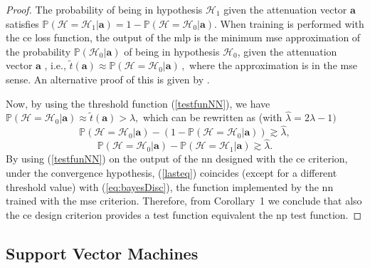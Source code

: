 \documentclass[draftcls,journal,onecolumn]{IEEEtran}
\begin{document}
\begin{proof}
The probability of being in hypothesis $\mathcal{H}_1$ given the attenuation vector $\bm{a}$ satisfies
$
    \mathbb{P}(\mathcal{H} = \mathcal{H}_1|\bm{a} ) = 1- \mathbb{P}(\mathcal{H} = \mathcal{H}_0|\bm{a} ).
$
When training is performed with the \ac{ce} loss function, the output of the \ac{mlp} is the minimum \ac{mse} approximation of the probability $\mathbb{P}(\mathcal{H}_0|\bm{a})$ of being in hypothesis $\mathcal{H}_0$, given the attenuation vector $\bm{a}$ \cite[Section~5.2]{Bishop2006}, i.e.,
$
    \tilde{t}(\bm{a}) \approx \mathbb{P}(\mathcal{H}=\mathcal{H}_0|\bm{a})\,,
$
where the approximation is in the \ac{mse} sense. {An alternative proof of this is given by \cite{nostro}.}

Now, by using the threshold function (\ref{testfunNN}), we have $
    \mathbb{P}(\mathcal{H}=\mathcal{H}_0|\bm{a}) \approx  \tilde{t}(\bm{a}) > \lambda,
$ which can be rewritten as (with $\hat{\lambda}=2\lambda-1)$
\begin{equation}
    \mathbb{P}(\mathcal{H}=\mathcal{H}_0|\bm{a} )-(1-\mathbb{P}(\mathcal{H}=\mathcal{H}_0|\bm{a} )) \gtrsim \hat{\lambda},
\end{equation}
\begin{equation}
\label{lasteq}
    \mathbb{P}(\mathcal{H}=\mathcal{H}_0|\bm{a} )-\mathbb{P}(\mathcal{H}=\mathcal{H}_1|\bm{a} ) \gtrsim \hat{\lambda}.
\end{equation}
By using (\ref{testfunNN}) on the output of the \ac{nn} designed with the \ac{ce} criterion, under the convergence hypothesis, (\ref{lasteq}) coincides (except for a different threshold value) with (\ref{eq:bayesDisc}), the function implemented by the \ac{nn} trained with the \ac{mse} criterion. Therefore, from Corollary~1 we conclude that also the \ac{ce} design criterion provides a test function equivalent the \ac{np} test function.
\end{proof}

\subsection{Support Vector Machines}\label{sec:svm}
\end{document}

